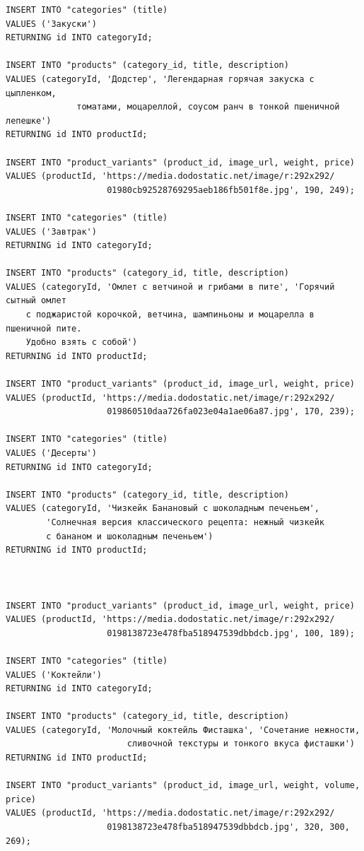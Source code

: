 \documentclass[a4paper,14pt]{extarticle}
\begin{document}
\begin{Verbatim}[tabsize=4,fontsize=\small]
INSERT INTO "categories" (title)
VALUES ('Закуски')
RETURNING id INTO categoryId;

INSERT INTO "products" (category_id, title, description)
VALUES (categoryId, 'Додстер', 'Легендарная горячая закуска с цыпленком, 
              томатами, моцареллой, соусом ранч в тонкой пшеничной лепешке')
RETURNING id INTO productId;

INSERT INTO "product_variants" (product_id, image_url, weight, price)
VALUES (productId, 'https://media.dodostatic.net/image/r:292x292/
                    01980cb92528769295aeb186fb501f8e.jpg', 190, 249);

INSERT INTO "categories" (title)
VALUES ('Завтрак')
RETURNING id INTO categoryId;

INSERT INTO "products" (category_id, title, description)
VALUES (categoryId, 'Омлет с ветчиной и грибами в пите', 'Горячий сытный омлет 
    с поджаристой корочкой, ветчина, шампиньоны и моцарелла в пшеничной пите. 
    Удобно взять с собой')
RETURNING id INTO productId;

INSERT INTO "product_variants" (product_id, image_url, weight, price)
VALUES (productId, 'https://media.dodostatic.net/image/r:292x292/
                    019860510daa726fa023e04a1ae06a87.jpg', 170, 239);

INSERT INTO "categories" (title)
VALUES ('Десерты')
RETURNING id INTO categoryId;

INSERT INTO "products" (category_id, title, description)
VALUES (categoryId, 'Чизкейк Банановый с шоколадным печеньем', 
        'Солнечная версия классического рецепта: нежный чизкейк 
        с бананом и шоколадным печеньем')
RETURNING id INTO productId;



INSERT INTO "product_variants" (product_id, image_url, weight, price)
VALUES (productId, 'https://media.dodostatic.net/image/r:292x292/
                    0198138723e478fba518947539dbbdcb.jpg', 100, 189);

INSERT INTO "categories" (title)
VALUES ('Коктейли')
RETURNING id INTO categoryId;

INSERT INTO "products" (category_id, title, description)
VALUES (categoryId, 'Молочный коктейль Фисташка', 'Сочетание нежности, 
                        сливочной текстуры и тонкого вкуса фисташки')
RETURNING id INTO productId;

INSERT INTO "product_variants" (product_id, image_url, weight, volume, price)
VALUES (productId, 'https://media.dodostatic.net/image/r:292x292/
                    0198138723e478fba518947539dbbdcb.jpg', 320, 300, 269);


\end{Verbatim}
\end{document}
